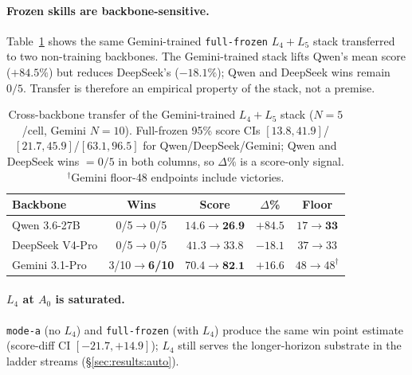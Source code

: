 \paragraph{Frozen skills are backbone-sensitive.}
Table~\ref{tab:crossbackbone} shows the same Gemini-trained
\texttt{full-frozen} $L_4{+}L_5$ stack transferred to two
non-training backbones. The Gemini-trained stack lifts Qwen's
mean score ($+84.5\%$) but reduces DeepSeek's ($-18.1\%$); Qwen and
DeepSeek wins remain $0/5$. Transfer is therefore an empirical
property of the stack, not a premise.

\begin{table}[!t]
\centering\scriptsize
\caption{Cross-backbone transfer of the Gemini-trained
$L_4{+}L_5$ stack ($N{=}5$/cell, Gemini $N{=}10$). Full-frozen 95\%
score CIs $[13.8,41.9]$/$[21.7,45.9]$/$[63.1,96.5]$ for
Qwen/DeepSeek/Gemini; Qwen and DeepSeek wins $=0/5$ in both columns,
so $\Delta\%$ is a score-only signal. $^{\dagger}$Gemini
floor-48 endpoints include victories.}
\label{tab:crossbackbone}
\setlength{\tabcolsep}{3pt}
\renewcommand{\arraystretch}{1.0}
\begin{tabular*}{\columnwidth}{@{\extracolsep{\fill}}lcccc@{}}
\toprule
Backbone & Wins & Score & $\Delta$\% & Floor \\
\midrule
Qwen 3.6-27B    & 0/5$\to$0/5            & $14.6\!\to\!\textbf{26.9}$ & $+84.5$ & $17\!\to\!\textbf{33}$ \\
DeepSeek V4-Pro & 0/5$\to$0/5            & $41.3\!\to\!33.8$          & $-18.1$ & $37\!\to\!33$ \\
Gemini 3.1-Pro  & 3/10$\to$\textbf{6/10} & $70.4\!\to\!\textbf{82.1}$ & $+16.6$ & $48\!\to\!48^{\dagger}$ \\
\bottomrule
\end{tabular*}
\end{table}

\paragraph{$L_4$ at $A_0$ is saturated.}
\label{sec:results:l4}
\texttt{mode-a} (no $L_4$) and \texttt{full-frozen} (with $L_4$)
produce the same win point estimate (score-diff CI $[-21.7,+14.9]$);
$L_4$ still serves the longer-horizon substrate in the ladder
streams (\S\ref{sec:results:auto}).
